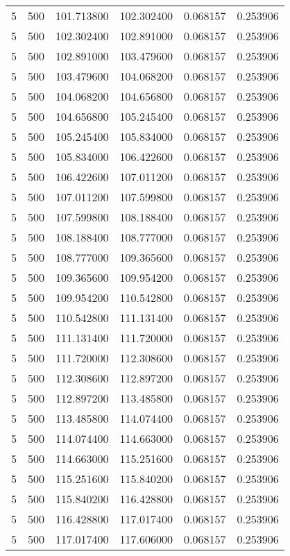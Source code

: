 \begin{longtable}{rrrrrr}
5 & 500 & 101.713800 & 102.302400 & 0.068157 & 0.253906 \\
5 & 500 & 102.302400 & 102.891000 & 0.068157 & 0.253906 \\
5 & 500 & 102.891000 & 103.479600 & 0.068157 & 0.253906 \\
5 & 500 & 103.479600 & 104.068200 & 0.068157 & 0.253906 \\
5 & 500 & 104.068200 & 104.656800 & 0.068157 & 0.253906 \\
5 & 500 & 104.656800 & 105.245400 & 0.068157 & 0.253906 \\
5 & 500 & 105.245400 & 105.834000 & 0.068157 & 0.253906 \\
5 & 500 & 105.834000 & 106.422600 & 0.068157 & 0.253906 \\
5 & 500 & 106.422600 & 107.011200 & 0.068157 & 0.253906 \\
5 & 500 & 107.011200 & 107.599800 & 0.068157 & 0.253906 \\
5 & 500 & 107.599800 & 108.188400 & 0.068157 & 0.253906 \\
5 & 500 & 108.188400 & 108.777000 & 0.068157 & 0.253906 \\
5 & 500 & 108.777000 & 109.365600 & 0.068157 & 0.253906 \\
5 & 500 & 109.365600 & 109.954200 & 0.068157 & 0.253906 \\
5 & 500 & 109.954200 & 110.542800 & 0.068157 & 0.253906 \\
5 & 500 & 110.542800 & 111.131400 & 0.068157 & 0.253906 \\
5 & 500 & 111.131400 & 111.720000 & 0.068157 & 0.253906 \\
5 & 500 & 111.720000 & 112.308600 & 0.068157 & 0.253906 \\
5 & 500 & 112.308600 & 112.897200 & 0.068157 & 0.253906 \\
5 & 500 & 112.897200 & 113.485800 & 0.068157 & 0.253906 \\
5 & 500 & 113.485800 & 114.074400 & 0.068157 & 0.253906 \\
5 & 500 & 114.074400 & 114.663000 & 0.068157 & 0.253906 \\
5 & 500 & 114.663000 & 115.251600 & 0.068157 & 0.253906 \\
5 & 500 & 115.251600 & 115.840200 & 0.068157 & 0.253906 \\
5 & 500 & 115.840200 & 116.428800 & 0.068157 & 0.253906 \\
5 & 500 & 116.428800 & 117.017400 & 0.068157 & 0.253906 \\
5 & 500 & 117.017400 & 117.606000 & 0.068157 & 0.253906 \\

\end{longtable}
